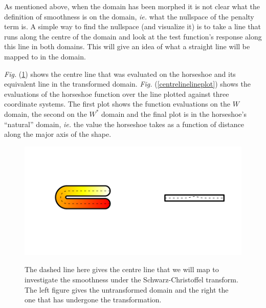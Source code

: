 \documentclass[a4paper,10pt]{amsart}
\newcommand{\sch}{Schwarz-Christoffel }
\newcommand{\Fig}[1]{\emph{Fig.} (\ref{#1})}
\begin{document}
As mentioned above, when the domain has been morphed it is not clear what the definition of smoothness is on the domain, \emph{ie.} what the nullspace of the penalty term is. A simple way to find the nullspace (and visualize it) is to take a line that runs along the centre of the domain and look at the test function's response along this line in both domains. This will give an idea of what a straight line will be mapped to in the domain.

\Fig{horseshoecentreline} shows the centre line that was evaluated on the horseshoe and its equivalent line in the transformed domain. \Fig{centrelinelineplot} shows the evaluations of the horseshoe function over the line plotted against three coordinate systems. The first plot shows the function evaluations on the $W$ domain, the second on the $W^*$ domain and the final plot is in the horseshoe's ``natural'' domain, \emph{ie.} the value the horseshoe takes as a function of distance along the major axis of the shape.

\begin{figure}
\centering
\includegraphics[trim=0.5in 1in 0in 1in]{figs/horseshoecentreline.pdf} \\
\caption{The dashed line here gives the centre line that we will map to investigate the smoothness under the \sch transform. The left figure gives the untransformed domain and the right the one that has undergone the transformation.}
\label{horseshoecentreline}
\end{figure}
\end{document}
